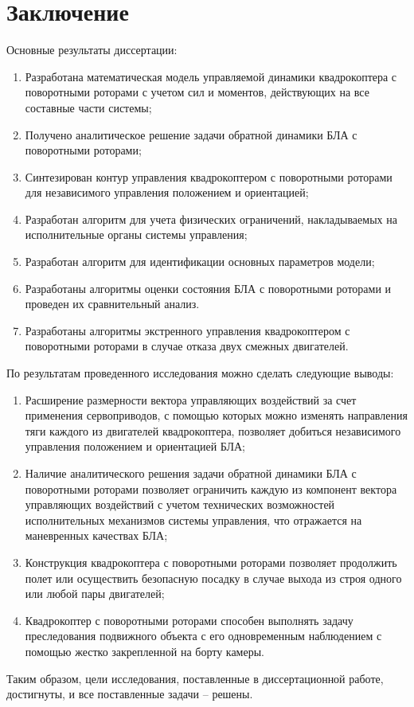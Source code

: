 \chapter{Заключение}
Основные результаты диссертации:
\begin{enumerate}
	\item Разработана математическая модель управляемой динамики квадрокоптера с поворотными роторами с учетом сил и моментов, действующих на все составные части системы;
	\item  Получено аналитическое решение задачи обратной динамики БЛА с поворотными роторами;
	\item Синтезирован контур управления квадрокоптером с поворотными роторами для независимого управления положением и ориентацией; 
	\item Разработан алгоритм для учета физических ограничений, накладываемых на исполнительные органы системы управления;
	\item Разработан алгоритм для идентификации основных параметров модели;
	\item Разработаны алгоритмы оценки состояния БЛА с поворотными роторами и проведен их сравнительный анализ.
	\item Разработаны алгоритмы экстренного управления квадрокоптером с поворотными роторами в случае отказа двух смежных двигателей.
\end{enumerate}
По результатам проведенного исследования можно сделать следующие
выводы:
\begin{enumerate}
	\item Расширение размерности вектора управляющих воздействий за счет применения сервоприводов, с помощью которых можно изменять направления тяги каждого из двигателей квадрокоптера, позволяет добиться независимого управления положением и ориентацией БЛА;
	\item Наличие аналитического решения задачи обратной динамики БЛА с поворотными роторами  позволяет ограничить каждую из компонент вектора управляющих воздействий с учетом технических возможностей исполнительных механизмов системы управления, что отражается на маневренных качествах БЛА;
	\item Конструкция квадрокоптера с поворотными роторами позволяет продолжить полет или осуществить безопасную посадку в случае выхода из строя одного или любой пары двигателей;
	\item Квадрокоптер с поворотными роторами способен выполнять задачу преследования подвижного объекта с его одновременным наблюдением с помощью жестко закрепленной на борту камеры.
\end{enumerate}
Таким образом, цели исследования, поставленные в диссертационной работе, достигнуты, и все
поставленные задачи – решены.